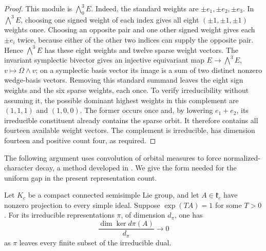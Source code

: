 \begin{proof}
This module is $\bigwedge^3_0E$. Indeed, the standard weights
are $\pm e_1,\pm e_2,\pm e_3$. In $\bigwedge^3E$,
choosing one signed weight of each index gives all eight
$(\pm1,\pm1,\pm1)$ weights once. Choosing an opposite pair
and one other signed weight gives each $\pm e_i$ twice,
because either of the other two indices can supply the opposite
pair. Hence $\bigwedge^3E$ has these eight weights and twelve
sparse weight vectors. The invariant symplectic bivector gives
an injective equivariant map $E\to\bigwedge^3E$,
$v\mapsto\Omega\wedge v$; on a symplectic basis vector its
image is a sum of two distinct nonzero wedge-basis vectors.
Removing this standard summand leaves the eight sign weights
and the six sparse weights, each once. To verify irreducibility
without assuming it, the possible dominant highest weights in
this complement are $(1,1,1)$ and $(1,0,0)$. The former occurs
once and, by lowering $e_1+e_2$, its irreducible constituent
already contains the sparse orbit. It therefore contains all
fourteen available weight vectors. The complement is irreducible,
has dimension fourteen and positive count four, as required.
\end{proof}

The following argument uses convolution of orbital measures to force
normalized-character decay, a method developed in
\cite{Ragozin1972,HareWilsonYee2000}. We give the form needed for the
uniform gap in the present representation count.

\begin{lemma}
\label{lem:panels-zero-weight-decay}
Let $K_c$ be a compact connected semisimple Lie group, and let
$A\in\mathfrak k_c$ have nonzero projection to every simple ideal.
Suppose $\exp(TA)=1$ for some $T>0$. For its irreducible
representations $\pi$, of dimension $d_\pi$, one has
\[
 \frac{\dim\ker d\pi(A)}{d_\pi}\longrightarrow0
\]
as $\pi$ leaves every finite subset of the irreducible dual.
\end{lemma}

